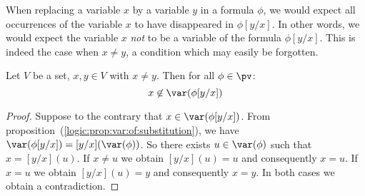When replacing a variable $x$ by a variable $y$ in a formula $\phi$,
we would expect all occurrences of the variable $x$ to have
disappeared in $\phi[y/x]$. In other words, we would expect the
variable $x$ {\em not} to be a variable of the formula  $\phi[y/x]$.
This is indeed the case when $x\neq y$, a condition which may easily
be forgotten.
\begin{prop}\label{logic:prop:inplaceof:notvar}
Let $V$ be a set, $x,y\in V$ with $x\neq y$. Then for all $\phi\in\pv$:
    \[
    x\not\in\var(\phi[y/x])
    \]
\end{prop}
\begin{proof}
Suppose to the contrary that $x\in\var(\phi[y/x])$. From
proposition~(\ref{logic:prop:var:of:substitution}), we have
$\var(\phi[y/x]) = [y/x](\var(\phi))$. So there exists
$u\in\var(\phi)$ such that $x=[y/x](u)$. If $x\neq u$ we obtain
$[y/x](u)=u$ and consequently $x=u$. If $x=u$ we obtain $[y/x](u)=y$
and consequently $x=y$. In both cases we obtain a contradiction.
\end{proof}
